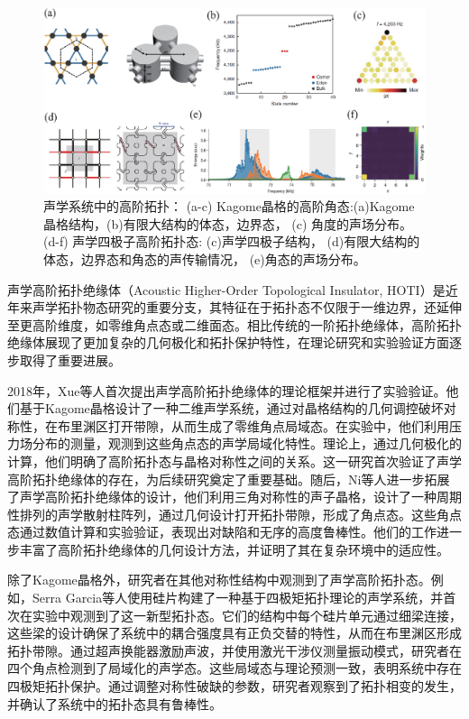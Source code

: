 \begin{figure}[h!]
    \centering
    \includegraphics[width=1\textwidth]{images/fig1-11.eps} 
    \caption{声学系统中的高阶拓扑：
    (a-c) Kagome晶格的高阶角态\cite{i4}:(a)Kagome晶格结构，(b)有限大结构的体态，边界态， (c) 角度的声场分布。
    (d-f) 声学四极子高阶拓扑态\cite{i6}: (c)声学四极子结构， (d)有限大结构的体态，边界态和角态的声传输情况， (e)角态的声场分布。
    }
    \label{fig_1_11}
\end{figure}

声学高阶拓扑绝缘体（Acoustic Higher-Order Topological Insulator, HOTI）是近年来声学拓扑物态研究的重要分支，其特征在于拓扑态不仅限于一维边界，还延伸至更高阶维度，如零维角点态或二维面态。相比传统的一阶拓扑绝缘体，高阶拓扑绝缘体展现了更加复杂的几何极化和拓扑保护特性，在理论研究和实验验证方面逐步取得了重要进展。

2018年，Xue等人首次提出声学高阶拓扑绝缘体的理论框架并进行了实验验证\cite{i4}。他们基于Kagome晶格设计了一种二维声学系统，通过对晶格结构的几何调控破坏对称性，在布里渊区打开带隙，从而生成了零维角点局域态。在实验中，他们利用压力场分布的测量，观测到这些角点态的声学局域化特性。理论上，通过几何极化的计算，他们明确了高阶拓扑态与晶格对称性之间的关系。这一研究首次验证了声学高阶拓扑绝缘体的存在，为后续研究奠定了重要基础。随后，Ni等人进一步拓展了声学高阶拓扑绝缘体的设计\cite{i5}，他们利用三角对称性的声子晶格，设计了一种周期性排列的声学散射柱阵列，通过几何设计打开拓扑带隙，形成了角点态。这些角点态通过数值计算和实验验证，表现出对缺陷和无序的高度鲁棒性。他们的工作进一步丰富了高阶拓扑绝缘体的几何设计方法，并证明了其在复杂环境中的适应性。

除了Kagome晶格外，研究者在其他对称性结构中观测到了声学高阶拓扑态\cite{i6}。例如，Serra Garcia等人使用硅片构建了一种基于四极矩拓扑理论的声学系统，并首次在实验中观测到了这一新型拓扑态。它们的结构中每个硅片单元通过细梁连接，这些梁的设计确保了系统中的耦合强度具有正负交替的特性，从而在布里渊区形成拓扑带隙。通过超声换能器激励声波，并使用激光干涉仪测量振动模式，研究者在四个角点检测到了局域化的声学态。这些局域态与理论预测一致，表明系统中存在四极矩拓扑保护。通过调整对称性破缺的参数，研究者观察到了拓扑相变的发生，并确认了系统中的拓扑态具有鲁棒性。

